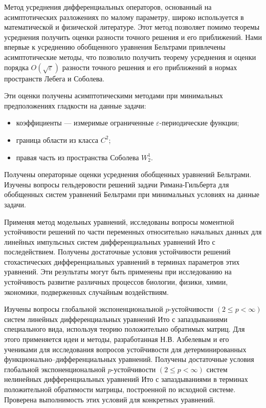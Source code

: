 






Метод усреднения дифференциальных операторов, основанный на асимптотических разложениях по малому параметру, широко используется  в математической и физической литературе. Этот метод позволяет помимо теоремы усреднения получить оценки разности точного решения и его приближений. Нами впервые к усреднению обобщенного уравнения Бельтрами привлечены асимптотические методы, что позволило получить теорему усреднения и оценки порядка $O(\sqrt{\varepsilon})$ разности точного решения и его приближений в нормах пространств Лебега и Соболева.


Эти оценки получены асимптотическими методами при минимальных предположениях гладкости на данные задачи:

\begin{itemize}
  \item
  коэффициенты --- измеримые ограниченные $\varepsilon$-периодические функции;
  \item
  граница области из класса $C^2$;
  \item
  правая часть из пространства Соболева $W_2^1$.
\end{itemize}

Получены операторные оценки усреднения обобщенных уравнений Бельтрами. Изучены вопросы гельдеровости решений задачи Римана-Гильберта для обобщенных систем уравнений Бельтрами при минимальных условиях на данные задачи.





Применяя метод модельных уравнений, исследованы вопросы моментной устойчивости решений по части переменных относительно начальных данных для линейных импульсных систем  дифференциальных уравнений Ито с последействием.
Получены достаточные условия устойчивости решений стохастических дифференциальных уравнений в терминах параметров этих уравнений.  Эти результаты могут быть применены при исследованию на  устойчивость развитие различных процессов биологии, физики, химии, экономики, подверженных случайным воздействиям.


Изучены вопросы  глобальной экспоненциональной $p$-устойчивости $(2 \le p < \infty)$ систем линейных дифференциальных уравнений Ито с запаздываниями специального вида, используя теорию положительно обратимых матриц. Для этого применяется идеи и методы, разработанная Н.В. Азбелевым и его учениками для исследования вопросов устойчивости для детерминированных функционально--дифференциальных уравнений. Получены достаточные условия глобальной экспоненциональной $p$-устойчивости $(2 \le p < \infty)$ систем нелинейных  дифференциальных уравнений Ито с запаздываниями в терминах положительной обратимости матрицы, построенной по исходной системе. Проверена  выполнимость этих условий для конкретных уравнений.



